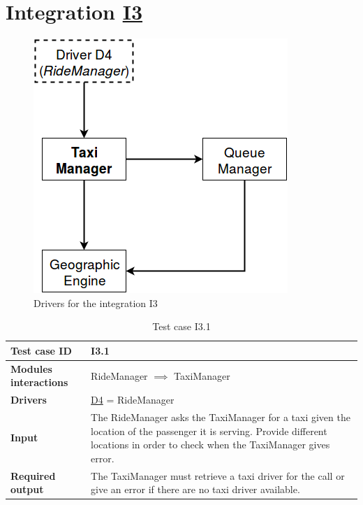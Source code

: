 \section{Integration \hyperref[I3]{I3} \label{int_I3}}
\begin{figure}[H]
\centering
\includegraphics[scale = 0.5]{"../Analysis Documents/I3"}
\caption{Drivers for the integration I3}
\end{figure}


\begin{table}[H]
\begin{tabular}{ l | p{} }
\textbf{Test case ID} & I3.1 \\ \hline
\textbf{Modules interactions} & RideManager $\implies$ TaxiManager \\ \hline
\textbf{Drivers} &  \hyperref[D4]{D4} = RideManager \\ \hline
\textbf{Input} & The RideManager asks the TaxiManager for a taxi given the location of the passenger it is serving. Provide different locations in order to check when the TaxiManager gives error. \\ \hline
\textbf{Required output} & The TaxiManager must retrieve a taxi driver for the call or give an error if there are no taxi driver available.
\end{tabular}
\caption{Test case I3.1}
\end{table}